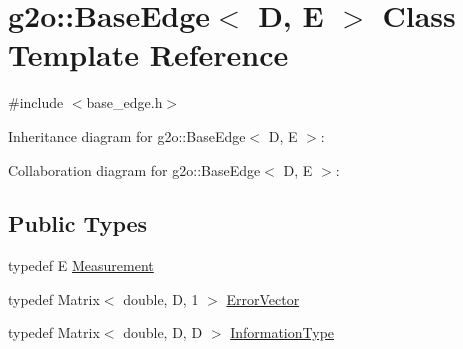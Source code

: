 \hypertarget{classg2o_1_1BaseEdge}{}\section{g2o\+:\+:Base\+Edge$<$ D, E $>$ Class Template Reference}
\label{classg2o_1_1BaseEdge}


{\ttfamily \#include $<$base\+\_\+edge.\+h$>$}



Inheritance diagram for g2o\+:\+:Base\+Edge$<$ D, E $>$\+:


Collaboration diagram for g2o\+:\+:Base\+Edge$<$ D, E $>$\+:
\subsection*{Public Types}
\begin{DoxyCompactItemize}
\item 
typedef E \hyperlink{classg2o_1_1BaseEdge_a2c148abba650a20b8c7eed75d3e2211e}{Measurement}
\item 
typedef Matrix$<$ double, D, 1 $>$ \hyperlink{classg2o_1_1BaseEdge_af5b558dd24e4be2e437563cae4b3550d}{Error\+Vector}
\item 
typedef Matrix$<$ double, D, D $>$ \hyperlink{classg2o_1_1BaseEdge_a2e5a33343ac3f189d8a7d5ee4d8b73fc}{Information\+Type}
\end{DoxyCompactItemize}
